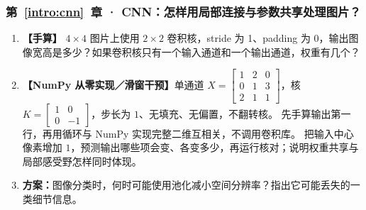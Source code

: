 \subsubsection*{第~\ref*{intro:cnn}~章 · CNN：怎样用局部连接与参数共享处理图片？}
\begin{enumerate}[label={},leftmargin=4.8em,itemsep=4pt]
\item[\textbf{C-125.}] \leavevmode{}\label{exercise:C-125}\label{exercise:convolution-output-shape}\textbf{【手算】} $4\times4$ 图片上使用 $2\times2$ 卷积核，stride 为 1、padding 为 0，输出图像宽高是多少？如果卷积核只有一个输入通道和一个输出通道，权重有几个？
\item[\textbf{C-126.}] \leavevmode{}\label{exercise:C-126}\label{exercise:convolution-shared-kernel}\textbf{【NumPy 从零实现／滑窗干预】}单通道 $X=\begin{bmatrix}1&2&0\\0&1&3\\2&1&1\end{bmatrix}$，核 $K=\begin{bmatrix}1&0\\0&-1\end{bmatrix}$，步长为 $1$、无填充、无偏置，不翻转核。
先手算输出第一行，再用循环与 NumPy 实现完整二维互相关，不调用卷积库。
把输入中心像素增加 $1$，预测输出哪些项会变、各变多少，再运行核对；说明权重共享与局部感受野怎样同时体现。
\item[\textbf{C-127.}] \leavevmode{}\label{exercise:C-127}\label{exercise:pooling-detail-loss}\textbf{方案：}图像分类时，何时可能使用池化减小空间分辨率？指出它可能丢失的一类细节信息。
\end{enumerate}
